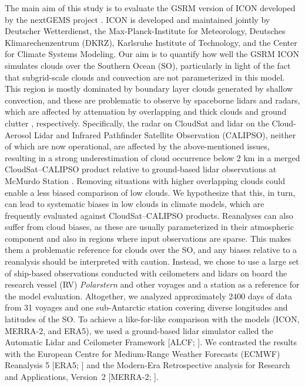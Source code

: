 \documentclass[draft]{agujournal2019}
\begin{document}
The main aim of this study is to evaluate the GSRM version of ICON developed by the nextGEMS project \cite{nextgems,segura2025}. ICON is developed and maintained jointly by Deutscher Wetterdienst, the Max-Planck-Institute for Meteorology, Deutsches Klimarechenzentrum (DKRZ), Karlsruhe Institute of Technology, and the Center for Climate Systems Modeling. Our aim is to quantify how well the GSRM ICON simulates clouds over the Southern Ocean (SO), particularly in light of the fact that subgrid-scale clouds and convection are not parameterized in this model. This region is mostly dominated by boundary layer clouds generated by shallow convection, and these are problematic to observe by spaceborne lidars and radars, which are affected by attenuation by overlapping and thick clouds \cite{mace2009,medeiros2010} and ground clutter \cite{marchand2008}, respectively. Specifically, the radar on CloudSat and lidar on the Cloud-Aerosol Lidar and Infrared Pathfinder Satellite Observation (CALIPSO), neither of which are now operational, are affected by the above-mentioned issues, resulting in a strong underestimation of cloud occurrence below 2 km in a merged CloudSat–CALIPSO product relative to ground-based lidar observations at McMurdo Station \cite{mcerlich2021}. Removing situations with higher overlapping clouds could enable a less biased comparison of low clouds. We hypothesize that this, in turn, can lead to systematic biases in low clouds in climate models, which are frequently evaluated against CloudSat–CALIPSO products. Reanalyses can also suffer from cloud biases, as these are usually parameterized in their atmospheric component and also in regions where input observations are sparse. This makes them a problematic reference for clouds over the SO, and any biases relative to a reanalysis should be interpreted with caution. Instead, we chose to use a large set of ship-based observations conducted with ceilometers and lidars on board the research vessel (RV) \emph{Polarstern} and other voyages and a station as a reference for the model evaluation. Altogether, we analyzed approximately 2400 days of data from 31 voyages and one sub-Antarctic station covering diverse longitudes and latitudes of the SO. To achieve a like-for-like comparison with the models (ICON, MERRA-2, and ERA5), we used a ground-based lidar simulator called the Automatic Lidar and Ceilometer Framework [ALCF; ]. We contrasted the results with the European Centre for Medium-Range Weather Forecasts (ECMWF) Reanalysis 5 [ERA5; ] and the Modern-Era Retrospective analysis for Research and Applications, Version~2 [MERRA-2; ].
\end{document}

